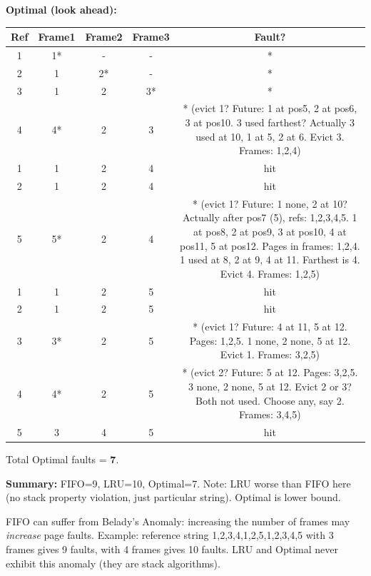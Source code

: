 \documentclass[11pt]{article}
\newcommand{\cle}[1]{{\popxbold\color{popdark}#1}}
\begin{document}
\begin{exoresolu}
\textbf{Optimal (look ahead):}
\begin{center}
\begin{tabular}{|c|c|c|c|c|}\hline
Ref & Frame1 & Frame2 & Frame3 & Fault? \\ \hline
1 & 1* & - & - & * \\
2 & 1 & 2* & - & * \\
3 & 1 & 2 & 3* & * \\
4 & 4* & 2 & 3 & * (evict 1? Future: 1 at pos5, 2 at pos6, 3 at pos10. 3 used farthest? Actually 3 used at 10, 1 at 5, 2 at 6. Evict 3. Frames: 1,2,4) \\
1 & 1 & 2 & 4 & hit \\
2 & 1 & 2 & 4 & hit \\
5 & 5* & 2 & 4 & * (evict 1? Future: 1 none, 2 at 10? Actually after pos7 (5), refs: 1,2,3,4,5. 1 at pos8, 2 at pos9, 3 at pos10, 4 at pos11, 5 at pos12. Pages in frames: 1,2,4. 1 used at 8, 2 at 9, 4 at 11. Farthest is 4. Evict 4. Frames: 1,2,5) \\
1 & 1 & 2 & 5 & hit \\
2 & 1 & 2 & 5 & hit \\
3 & 3* & 2 & 5 & * (evict 1? Future: 4 at 11, 5 at 12. Pages: 1,2,5. 1 none, 2 none, 5 at 12. Evict 1. Frames: 3,2,5) \\
4 & 4* & 2 & 5 & * (evict 2? Future: 5 at 12. Pages: 3,2,5. 3 none, 2 none, 5 at 12. Evict 2 or 3? Both not used. Choose any, say 2. Frames: 3,4,5) \\
5 & 3 & 4 & 5 & hit \\ \hline
\end{tabular}
\end{center}
Total Optimal faults = \textbf{7}.

\textbf{Summary:} FIFO=9, LRU=10, Optimal=7. Note: LRU worse than FIFO here (no stack property violation, just particular string). Optimal is lower bound.
\end{exoresolu}

\begin{attention}
FIFO can suffer from Belady's Anomaly: increasing the number of frames may \emph{increase} page faults. Example: reference string 1,2,3,4,1,2,5,1,2,3,4,5 with 3 frames gives 9 faults, with 4 frames gives 10 faults. LRU and Optimal never exhibit this anomaly (they are \cle{stack algorithms}).
\end{attention}
\end{document}
